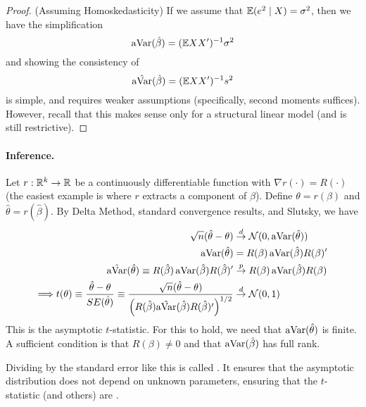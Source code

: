 \documentclass[10pt]{article}
\begin{document}
\begin{proof}
	(Assuming Homoskedasticity) If we assume that $\mathbb{E}(e^2 \mid X) = \sigma^2$, then we have the simplification \[\mathop{\rm aVar}(\hat{\beta}) = (\mathbb{E} XX')^{-1}\sigma^2\]and showing the consistency of \[\hat{\mathop{\rm aVar}}(\hat{\beta}) = (\mathbb{E} XX')^{-1} s^2\]is simple, and requires weaker assumptions (specifically, second moments suffices). However, recall that this makes sense only for a structural linear model (and is still restrictive).
\end{proof}


\paragraph{Inference.} Let $r: \mathbb{R}^k \to \mathbb{R}$ be a continuously differentiable function with $\nabla r(\cdot) = R(\cdot)$ (the easiest example is where $r$ extracts a component of $\beta$). Define $\theta = r(\beta)$ and $\hat{\theta} = r(\hat{\beta})$. By Delta Method, standard convergence results, and Slutsky, we have 
\begin{align*} 
	\sqrt{n}(\hat{\theta} - \theta) &\overset{d}{\to} \mathcal{N}(0,\mathop{\rm aVar}(\hat{\theta})) \\
	\mathop{\rm aVar}(\hat{\theta}) &= R(\beta) \mathop{\rm aVar}(\hat{\beta})R(\beta)' \\
	\hat{\mathop{\rm aVar}}(\hat{\theta}) \equiv  R(\hat{\beta}) \mathop{\rm aVar}(\hat{\beta})R(\hat{\beta})' &\overset{p}{\to} R(\beta) \mathop{\rm aVar}(\hat{\beta})R(\beta) \\ 
	\Longrightarrow t(\theta) \equiv \frac{\hat{\theta}-\theta}{SE(\hat{\theta})} \equiv \frac{\sqrt{n}(\hat{\theta}-\theta)}{\left( R(\hat{\beta})\hat{\mathop{\rm aVar}}(\hat{\beta}) R(\hat{\beta})'\right)^{1/2}} &\overset{d}{\to} \mathcal{N}(0,1)
\end{align*}
This is the asymptotic $t$-statistic. For this to hold, we need that $\mathop{\rm aVar}(\hat{\theta})$ is finite. A sufficient condition is that $R(\beta) \ne 0$ and that $\mathop{\rm aVar}(\hat{\beta})$ has full rank.

\begin{definition}
	Dividing by the standard error like this is called . It ensures that the asymptotic distribution does not depend on unknown parameters, ensuring that the $t$-statistic (and others) are .
\end{definition}
\end{document}
